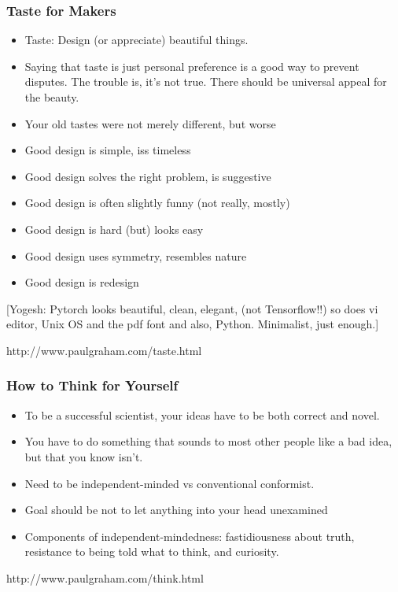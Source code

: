 \begin{frame}[fragile]\frametitle{Taste for Makers}

\begin{itemize}
\item Taste: Design (or appreciate) beautiful things.
\item Saying that taste is just personal preference is a good way to prevent disputes. The trouble is, it's not true. There should be universal appeal for the beauty.
\item Your old tastes were not merely different, but worse
\item Good design is simple, iss timeless
\item Good design solves the right problem, is suggestive
\item Good design is often slightly funny (not really, mostly)
\item Good design is hard (but) looks easy
\item Good design uses symmetry, resembles nature
\item Good design is redesign
\end{itemize}

[Yogesh: Pytorch looks beautiful, clean, elegant, (not Tensorflow!!) so does vi editor, Unix OS and the pdf font and also, Python. Minimalist, just enough.]

{\tiny http://www.paulgraham.com/taste.html}

\end{frame}

\begin{frame}[fragile]\frametitle{How to Think for Yourself}

\begin{itemize}
\item To be a successful scientist, your ideas have to be both correct and novel.
\item You have to do something that sounds to most other people like a bad idea, but that you know isn't. 
\item Need to be independent-minded vs conventional conformist.
\item Goal should be not to let anything into your head unexamined
\item Components of independent-mindedness: fastidiousness about truth, resistance to being told what to think, and curiosity.
\end{itemize}



{\tiny http://www.paulgraham.com/think.html}

\end{frame}

